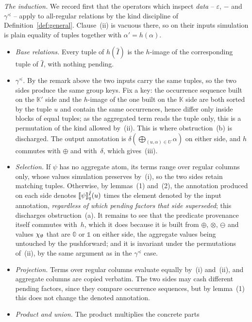 \begin{appendixproof}
\smallskip\noindent\emph{The induction.} We record first that the
operators which inspect \emph{data} -- $\varepsilon$, $-$ and
$\gamma^{\preceq}$ -- apply to all-regular relations by the kind
discipline of Definition~\ref{def:general}. Clause~(ii) is vacuous there,
so on their inputs simulation is plain equality of tuples together with
$\alpha'=h(\alpha)$.
\begin{itemize}
\item \emph{Base relations.} Every tuple of $h(\hat I)$ is the $h$-image
  of the corresponding tuple of $\hat I$, with nothing pending.
\item \emph{$\gamma^{\preceq}$.} By the remark above the two inputs carry
  the same tuples, so the two sides produce the same group keys. Fix a
  key: the occurrence sequence built on the $\mathbb K'$ side and the
  $h$-image of the one built on the $\mathbb K$ side are both sorted by
  the tuple $u$ and contain the same occurrences, hence differ only
  inside blocks of equal tuples; as the aggregated term reads the
  tuple only, this is a permutation of the kind allowed by~(ii).
  This is where obstruction~(b) is discharged. The output annotation is
  $\delta(\bigoplus_{(u,\alpha)\in U}\alpha)$ on either side, and $h$
  commutes with $\oplus$ and with~$\delta$, which gives~(iii).
\item \emph{Selection.} If $\psi$ has no aggregate atom, its terms range
  over regular columns only, whose values simulation preserves by~(i), so
  the two sides retain matching tuples. Otherwise, by
  lemmas~(1) and~(2), the annotation produced on each side denotes
  $\llbracket \psi\rrbracket^{\hat I}_{q}(u)$ times the element denoted by the input
  annotation, \emph{regardless of which pending factors that side
  superseded}; this discharges obstruction~(a). It remains to see that
  the predicate provenance itself commutes with~$h$, which it does
  because it is built from $\oplus$, $\otimes$, $\ominus$ and values
  $\chi_{\mathrel{\uptheta}}$ that are $\mathbb 0$ or $\mathbb 1$ on either side, the
  aggregate values being untouched by the pushforward; and it is
  invariant under the permutations of~(ii), by the same argument as in
  the $\gamma^{\preceq}$ case.
\item \emph{Projection.} Terms over regular columns evaluate equally
  by~(i) and~(ii), and aggregate columns are copied verbatim. The two
  sides may cash different pending factors, since they compare occurrence
  sequences, but by lemma~(1) this does not change the denoted
  annotation.
\item \emph{Product and union.} The product multiplies the concrete parts

\end{itemize}
\end{appendixproof}
